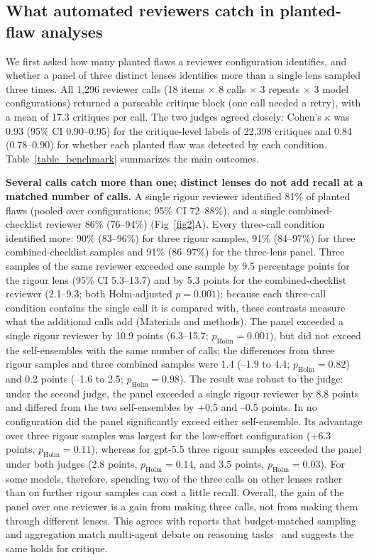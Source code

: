 \subsection*{What automated reviewers catch in planted-flaw analyses}

We first asked how many planted flaws a reviewer configuration identifies, and whether a panel of three distinct lenses identifies more than a single lens sampled three times. All 1,296 reviewer calls (18 items $\times$ 8 calls $\times$ 3 repeats $\times$ 3 model configurations) returned a parseable critique block (one call needed a retry), with a mean of 17.3 critiques per call. The two judges agreed closely: Cohen's $\kappa$ was 0.93 (95\% CI 0.90--0.95) for the critique-level labels of 22,398 critiques and 0.84 (0.78--0.90) for whether each planted flaw was detected by each condition. Table~\ref{table_benchmark} summarizes the main outcomes.

\textbf{Several calls catch more than one; distinct lenses do not add recall at a matched number of calls.} A single rigour reviewer identified 81\% of planted flaws (pooled over configurations; 95\% CI 72--88\%), and a single combined-checklist reviewer 86\% (76--94\%) (Fig~\ref{fig2}A). Every three-call condition identified more: 90\% (83--96\%) for three rigour samples, 91\% (84--97\%) for three combined-checklist samples and 91\% (86--97\%) for the three-lens panel. Three samples of the same reviewer exceeded one sample by 9.5 percentage points for the rigour lens (95\% CI 5.3--13.7) and by 5.3 points for the combined-checklist reviewer (2.1--9.3; both Holm-adjusted $p=0.001$); because each three-call condition contains the single call it is compared with, these contrasts measure what the additional calls add (Materials and methods). The panel exceeded a single rigour reviewer by 10.9 points (6.3--15.7; $p_\mathrm{Holm}=0.001$), but did not exceed the self-ensembles with the same number of calls: the differences from three rigour samples and three combined samples were 1.4 (--1.9 to 4.4; $p_\mathrm{Holm}=0.82$) and 0.2 points (--1.6 to 2.5; $p_\mathrm{Holm}=0.98$). The result was robust to the judge: under the second judge, the panel exceeded a single rigour reviewer by 8.8 points and differed from the two self-ensembles by +0.5 and --0.5 points. In no configuration did the panel significantly exceed either self-ensemble. Its advantage over three rigour samples was largest for the low-effort configuration (+6.3 points, $p_\mathrm{Holm}=0.11$), whereas for gpt-5.5 three rigour samples exceeded the panel under both judges (2.8 points, $p_\mathrm{Holm}=0.14$, and 3.5 points, $p_\mathrm{Holm}=0.03$). For some models, therefore, spending two of the three calls on other lenses rather than on further rigour samples can cost a little recall. Overall, the gain of the panel over one reviewer is a gain from making three calls, not from making them through different lenses. This agrees with reports that budget-matched sampling and aggregation match multi-agent debate on reasoning tasks~\cite{wang2023selfconsistency,li2024moreagents,smit2024mad} and suggests the same holds for critique.

